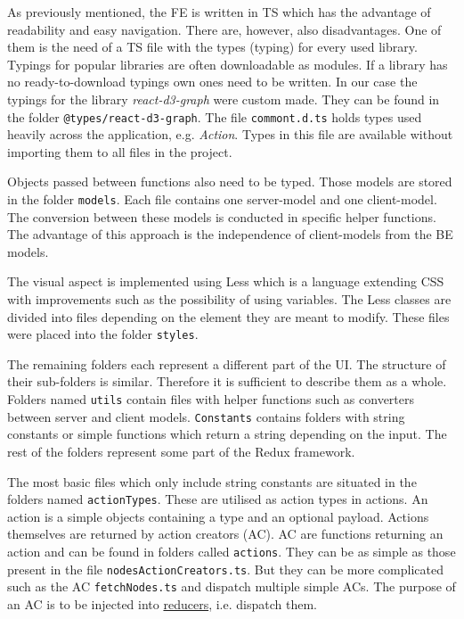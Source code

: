 As previously mentioned, the FE is written in TS which has the advantage of readability and easy navigation. There are, however, also disadvantages. One of them is the need of a TS file with the types (typing) for every used library. Typings for popular libraries are often downloadable as modules. If a library has no ready-to-download typings own ones need to be written. In our case the typings for the library \textit{react-d3-graph} were custom made. They can be found in the folder \texttt{@types/react-d3-graph}. The file \texttt{commont.d.ts} holds types used heavily across the application, e.g. \textit{Action}. Types in this file are available without importing them to all files in the project.  

Objects passed between functions also need to be typed. Those models are stored in the folder \texttt{models}. Each file contains one server-model and one client-model. The conversion between these models is conducted in specific helper functions. The advantage of this approach is the independence of client-models from the BE models.

The visual aspect is implemented using Less \cite{less} which is a language extending CSS with improvements such as the possibility of using variables. The Less classes are divided into files depending on the element they are meant to modify. These files were placed into the folder \texttt{styles}. 

The remaining folders each represent a different part of the UI. The structure of their sub-folders is similar. Therefore it is sufficient to describe them as a whole. Folders named \texttt{utils} contain files with helper functions such as converters between server and client models. \texttt{Constants} contains folders with string constants or simple functions which return a string depending on the input. The rest of the folders represent some part of the Redux framework. 

The most basic files which only include string constants are situated in the folders named \texttt{actionTypes}.  These are utilised as action types in actions. An action is a simple objects containing a type and an optional payload. Actions themselves are returned by action creators (AC). AC are functions returning an action and can be found in folders called \texttt{actions}. They can be as simple as those present in the file \texttt{nodesActionCreators.ts}. But they can be more complicated such as the AC \texttt{fetchNodes.ts} and dispatch multiple simple ACs. The purpose of an AC is to be injected into \hyperlink{reducers}{reducers}, i.e. dispatch them.

